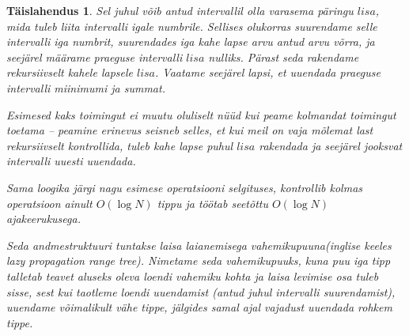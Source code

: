 \documentclass{trkut}
\newtheorem*{solution}{Täislahendus}
\begin{document}
\begin{solution}
Sel juhul võib antud intervallil olla varasema päringu $lisa$, mida tuleb liita intervalli igale numbrile. Sellises olukorras suurendame selle intervalli iga numbrit, suurendades iga kahe lapse arvu antud arvu võrra, ja seejärel määrame praeguse intervalli $lisa$ nulliks. Pärast seda rakendame rekursiivselt kahele lapsele $lisa$. Vaatame seejärel lapsi, et uuendada praeguse intervalli miinimumi ja summat.

Esimesed kaks toimingut ei muutu oluliselt nüüd kui peame kolmandat toimingut toetama -- peamine erinevus seisneb selles, et kui meil on vaja mõlemat last rekursiivselt kontrollida, tuleb kahe lapse puhul $lisa$ rakendada ja seejärel jooksvat intervalli uuesti uuendada.

Sama loogika järgi nagu esimese operatsiooni selgituses, kontrollib kolmas operatsioon ainult $O(\log N)$ tippu ja töötab seetõttu $O(\log N)$ ajakeerukusega.

Seda andmestruktuuri tuntakse laisa laianemisega vahemikupuuna(inglise keeles\textit{ lazy propagation range tree}). Nimetame seda vahemikupuuks, kuna puu iga tipp talletab teavet aluseks oleva loendi vahemiku kohta ja laisa levimise osa tuleb sisse, sest kui taotleme loendi uuendamist (antud juhul intervalli suurendamist), uuendame võimalikult vähe tippe, jälgides samal ajal vajadust uuendada rohkem tippe.

\end{solution}
\end{document}
